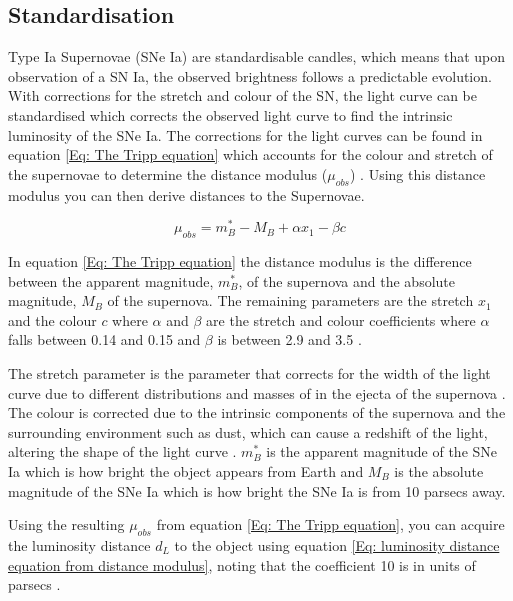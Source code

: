 \subsection{Standardisation} \label{subsec: Standardisation}
Type Ia Supernovae (SNe Ia) are standardisable candles, which means that upon observation of a SN Ia, the observed brightness follows a predictable evolution\parencite{martin_o_2024,rigault_strong_2020}. With corrections for the stretch and colour of the SN, the light curve can be standardised which corrects the observed light curve to find the intrinsic luminosity of the SNe Ia. The corrections for the light curves can be found in equation \ref{Eq: The Tripp equation} which accounts for the colour and stretch of the supernovae to determine the distance modulus (\(\mu_{obs}\)) \parencite{tripp_two-parameter_1998}. Using this distance modulus you can then derive distances to the Supernovae. 

\begin{equation}
    \mu_{obs} = m^*_B-M_B + \alpha x_1-\beta c
    \label{Eq: The Tripp equation}
\end{equation}

In equation \ref{Eq: The Tripp equation} the distance modulus is the difference between the apparent magnitude, \(m^*_B\), of the supernova and the absolute magnitude, \(M_B\) of the supernova. The remaining parameters are the stretch \(x_1\) and the colour \(c\) where \(\alpha\) and \(\beta\) are the stretch and colour coefficients where \(\alpha\) falls between 0.14 and 0.15 and \(\beta\) is between 2.9 and 3.5 \parencite{brout_pantheon_2022, martin_o_2024}. 

The stretch parameter is the parameter that corrects for the width of the light curve due to different distributions and masses of  in the ejecta of the supernova \parencite{deckers_constraining_2022}. The colour is corrected due to the intrinsic components of the supernova and the surrounding environment such as dust, which can cause a redshift of the light, altering the shape of the light curve \parencite{kelsey_concerning_2022}. \(m^*_B\) is the apparent magnitude of the SNe Ia which is how bright the object appears from Earth and \(M_B\) is the absolute magnitude of the SNe Ia which is how bright the SNe Ia is from 10 parsecs away. 

Using the resulting \(\mu_{obs}\) from equation \ref{Eq: The Tripp equation}, you can acquire the luminosity distance \(d_L\) to the object using equation \ref{Eq: luminosity distance equation from distance modulus}, noting that the coefficient 10 is in units of parsecs \parencite{brout_pantheon_2022}. 

